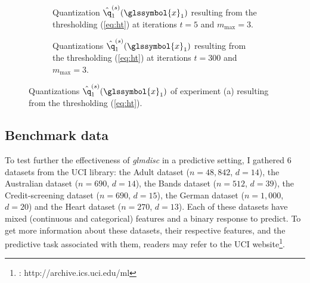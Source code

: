  \newlength\figureheight
 \newlength\figurewidth
 \setlength\figureheight{4cm}
 \setlength\figurewidth{14cm}
 
  \begin{figure}[!ht]
    \centering
    \begin{subfigure}[t]{\textwidth}
        \centering
        
        \vspace{-0.5cm}
        \caption{Quantization $\hat{\q}^{(s)}_1(\glssymbol{x}_1)$ resulting from the thresholding (\ref{eq:ht}) at iterations $t = 5$ and $m_{\text{max}} = 3$.}
    \end{subfigure}%
    
    \begin{subfigure}[t]{\textwidth}
        \centering
        
        \vspace{-0.5cm}
        \caption{Quantizations $\hat{\q}^{(s)}_1(\glssymbol{x}_1)$ resulting from the thresholding (\ref{eq:ht}) at iterations $t = 300$ and $m_{\text{max}} = 3$.}
    \end{subfigure}
    
    \caption{\label{fig:MAP} Quantizations $\hat{\q}^{(s)}_1(\glssymbol{x}_1)$ of experiment (a) resulting from the thresholding (\ref{eq:ht}).}
\end{figure}

\subsection{Benchmark data} \label{subsec:exp_benchmark}

To test further the effectiveness of \textit{glmdisc} in a predictive setting, I gathered 6 datasets from the UCI library: the Adult dataset ($n=48,842$, $d=14$), the Australian dataset ($n=690$, $d=14$), the Bands dataset ($n=512$, $d=39$), the Credit-screening dataset ($n=690$, $d=15$), the German dataset ($n=1,000$, $d=20$) and the Heart dataset ($n=270$, $d=13$). Each of these datasets have mixed (continuous and categorical) features and a binary response to predict. To get more information about these datasets, their respective features, and the predictive task associated with them, readers may refer to the UCI website\footnote{\cite{Dua:2017} : http://archive.ics.uci.edu/ml}.

